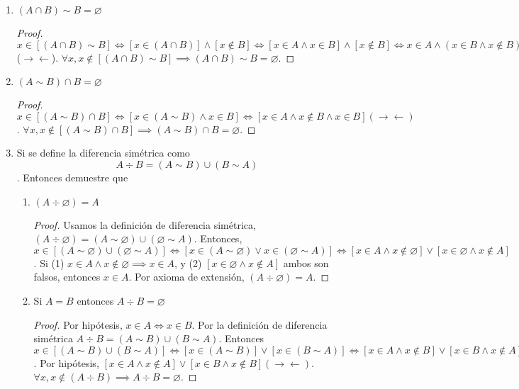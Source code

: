 \begin{enumerate}
\begin{proof}
	\end{proof}
	\item $(A \cap B) \sim B=\varnothing$
	\begin{proof}
		$x\in [(A\cap B)\sim B]\iff [x\in (A\cap B)]\wedge [x\not\in B]\iff [x\in A \wedge x\in B]\wedge [x\not\in B]\iff x\in A \wedge (x\in B\wedge x\not\in B)$ ($\to\gets$). $\forall x,  x\not\in [(A \cap B) \sim B]\implies (A \cap B) \sim B=\varnothing$. 
	\end{proof}
	\item $(A \sim B) \cap B=\varnothing$
	\begin{proof}
		$x\in [(A \sim B) \cap B]\iff [x\in (A\sim B)\wedge x\in B]\iff [x\in A \wedge x\not\in B\wedge x\in B] (\to \gets)$. $\forall x, x\not\in [(A \sim B) \cap B] \implies (A \sim B) \cap B=\varnothing$. 
	\end{proof}
	\item Si se define la diferencia simétrica como $$A \div B=(A \sim B) \cup(B \sim A)$$.
	Entonces demuestre que
	\begin{enumerate}
		\item $(A \div \varnothing)=A$
		\begin{proof}
			Usamos la definición de diferencia simétrica, $(A \div \varnothing)=(A\sim \varnothing)\cup (\varnothing\sim A)$. Entonces, $x\in [(A\sim \varnothing)\cup (\varnothing\sim A)]\iff [x\in (A\sim \varnothing) \vee x\in  (\varnothing\sim A)]\iff [x\in A \wedge x \not\in \varnothing]\vee [x\in \varnothing \wedge x\not\in A]$. Si (1) $x\in A \wedge x \not\in \varnothing\implies x\in A$, y (2) $[x\in \varnothing \wedge x\not\in A]$ ambos son falsos, entonces $x\in A$. Por axioma de extensión, $(A \div \varnothing)=A$. 
		\end{proof}
		\item  Si $A=B$ entonces $A \div B=\varnothing$
		\begin{proof}
			Por hipótesis, $x\in A\iff x\in B$. Por la definición de diferencia simétrica $A\div B= (A \sim B) \cup(B \sim A)$. Entonces $x\in [(A \sim B) \cup(B \sim A)]\iff [x\in (A \sim B)]\vee [x\in (B \sim A)]\iff [x\in A\wedge x\not\in B]\vee [x\in B\wedge x\not\in A] $. Por hipótesis, $[x\in A\wedge x\not\in A]\vee [x\in B\wedge x\not\in B] (\to\gets)$. $\forall x, x\not\in (A\div B) \implies A \div B=\varnothing$. 
		\end{proof}
	\end{enumerate}
\end{enumerate}





